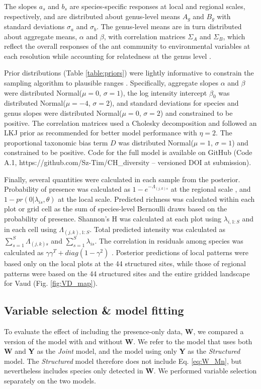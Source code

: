 \documentclass[preprint,review,times,12pt,3p]{elsarticle}
\begin{document}
The slopes $a_s$ and $b_s$ are species-specific responses at local and regional scales, respectively, and are distributed about genus-level means $A_g$ and $B_g$ with standard deviations $\sigma_a$ and $\sigma_b$. The genus-level means are in turn distributed about aggregate means, $\alpha$ and $\beta$, with correlation matrices $\Sigma_A$ and $\Sigma_B$, which reflect the overall responses of the ant community to environmental variables at each resolution while accounting for relatedness at the genus level \citep{Hadfield2010b,Ovaskainen2011,Szewczyk2018,Caradima2019}.

Prior distributions (Table \ref{table:priors}) were lightly informative to constrain the sampling algorithm to plausible ranges \citep{Carpenter2017,Lemoine2019}. Specifically, aggregate slopes $\alpha$ and $\beta$ were distributed Normal($\mu=0$, $\sigma=1$), the log intensity intercept $\beta_0$ was distributed Normal($\mu=-4$, $\sigma=2$), and standard deviations for species and genus slopes were distributed Normal($\mu=0$, $\sigma=2$) and constrained to be positive. The correlation matrices used a Cholesky decomposition and followed an LKJ prior as recommended for better model performance \citep{Carpenter2017,Caradima2019} with $\eta=2$. The proportional taxonomic bias term $D$ was distributed Normal($\mu=1$, $\sigma=1$) and constrained to be positive. Code for the full model is available on GitHub (Code A.1, https://github.com/Sz-Tim/CH\_diversity -- versioned DOI at submission).

Finally, several quantities were calculated in each sample from the posterior. Probability of presence was calculated as $1 - e^{-\Lambda_{(j,k)s}}$ at the regional scale \citep{Hefley2016}, and $1 - pr(0 | \lambda_{is}, \theta)$ at the local scale. Predicted richness was calculated within each plot or grid cell as the sum of species-level Bernoulli draws based on the probability of presence. Shannon's H was calculated at each plot using $\lambda_{i,1:S}$ and in each cell using $\Lambda_{(j,k),1:S}$. Total predicted intensity was calculated as $\sum_{s=1}^{S}\Lambda_{(j,k)s}$ and $\sum_{s=1}^{S}\lambda_{is}$. The correlation in residuals among species was calculated as $\gamma \gamma^T + diag(1 - \gamma^2)$ \citep{Tobler2019}. Posterior predictions of local patterns were based only on the local plots at the 44 structured sites, while those of regional patterns were based on the 44 structured sites and the entire gridded landscape for Vaud (Fig. \ref{fig:VD_map}). 


\subsection{Variable selection \& model fitting}
To evaluate the effect of including the presence-only data, \textbf{W}, we compared a version of the model with and without \textbf{W}. We refer to the model that uses both \textbf{W} and \textbf{Y} as the \emph{Joint} model, and the model using only \textbf{Y} as the \emph{Structured} model. The \emph{Structured} model therefore does not include Eq. \ref{eq:W_Mn}, but nevertheless includes species only detected in \textbf{W}. We performed variable selection separately on the two models.
\end{document}
